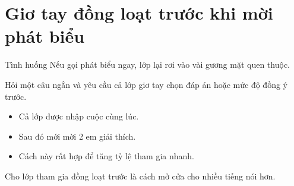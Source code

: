 \section{Giơ tay đồng loạt trước khi mời phát biểu}
\begin{tinhhuong}{Tình huống}
Nếu gọi phát biểu ngay, lớp lại rơi vào vài gương mặt quen thuộc.
\end{tinhhuong}
\begin{goiydungngay}
Hỏi một câu ngắn và yêu cầu cả lớp giơ tay chọn đáp án hoặc mức độ đồng ý trước.
\begin{itemize}
\item Cả lớp được nhập cuộc cùng lúc.
\item Sau đó mới mời 2 em giải thích.
\item Cách này rất hợp để tăng tỷ lệ tham gia nhanh.
\end{itemize}
\end{goiydungngay}
\begin{cauchot}
Cho lớp tham gia đồng loạt trước là cách mở cửa cho nhiều tiếng nói hơn.
\end{cauchot}
